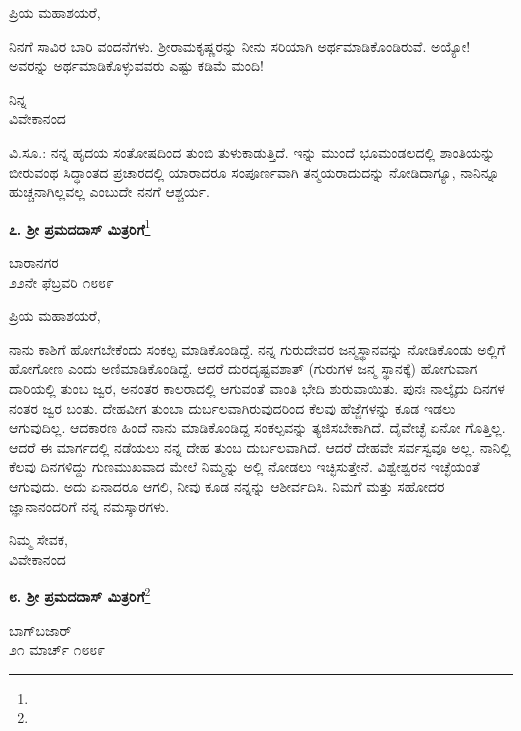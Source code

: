 \noindent
ಪ್ರಿಯ ಮಹಾಶಯರೆ,

ನಿನಗೆ ಸಾವಿರ ಬಾರಿ ವಂದನೆಗಳು. ಶ‍್ರೀರಾಮಕೃಷ್ಣರನ್ನು ನೀನು ಸರಿಯಾಗಿ ಅರ್ಥಮಾಡಿಕೊಂಡಿರುವೆ. ಅಯ್ಯೋ! ಅವರನ್ನು ಅರ್ಥಮಾಡಿಕೊಳ್ಳುವವರು ಎಷ್ಟು ಕಡಿಮೆ ಮಂದಿ!

\vspace{-0.3cm}

{\flushright
ನಿನ್ನ\\ವಿವೇಕಾನಂದ\par}

ವಿ.ಸೂ.:\enginline{-} ನನ್ನ ಹೃದಯ ಸಂತೋಷದಿಂದ ತುಂಬಿ ತುಳುಕಾಡುತ್ತಿದೆ. ಇನ್ನು ಮುಂದೆ ಭೂಮಂಡಲದಲ್ಲಿ ಶಾಂತಿಯನ್ನು ಬೀರುವಂಥ ಸಿದ್ಧಾಂತದ ಪ್ರಚಾರದಲ್ಲಿ ಯಾರಾದರೂ ಸಂಪೂರ್ಣವಾಗಿ ತನ್ಮಯರಾದುದನ್ನು ನೋಡಿದಾಗ್ಯೂ, ನಾನಿನ್ನೂ ಹುಚ್ಚನಾಗಿಲ್ಲವಲ್ಲ ಎಂಬುದೇ ನನಗೆ ಆಶ್ಚರ್ಯ.

\begin{center}
\textbf{೭. ಶ‍್ರೀ ಪ್ರಮದದಾಸ್ ಮಿತ್ರರಿಗೆ}\footnote{}
\end{center}

\begin{flushright}
ಬಾರಾನಗರ\\೨೨ನೇ ಫೆಬ್ರವರಿ ೧೮೮೯
\end{flushright}

\noindent
ಪ್ರಿಯ ಮಹಾಶಯರೆ,

ನಾನು ಕಾಶಿಗೆ ಹೋಗಬೇಕೆಂದು ಸಂಕಲ್ಪ ಮಾಡಿಕೊಂಡಿದ್ದೆ. ನನ್ನ ಗುರುದೇವರ ಜನ್ಮಸ್ಥಾನವನ್ನು ನೋಡಿಕೊಂಡು ಅಲ್ಲಿಗೆ ಹೋಗೋಣ ಎಂದು ಅಣಿಮಾಡಿಕೊಂಡಿದ್ದೆ. ಆದರೆ ದುರದೃಷ್ಟವಶಾತ್ (ಗುರುಗಳ ಜನ್ಮ ಸ್ಥಾನಕ್ಕೆ) ಹೋಗುವಾಗ ದಾರಿಯಲ್ಲಿ ತುಂಬ ಜ್ವರ, ಅನಂತರ ಕಾಲರಾದಲ್ಲಿ ಆಗುವಂತೆ ವಾಂತಿ ಭೇದಿ ಶುರುವಾಯಿತು. ಪುನಃ ನಾಲ್ಕೈದು ದಿನಗಳ ನಂತರ ಜ್ವರ ಬಂತು. ದೇಹವೀಗ ತುಂಬಾ ದುರ್ಬಲವಾಗಿರುವುದರಿಂದ ಕೆಲವು ಹೆಜ್ಜೆಗಳನ್ನು ಕೂಡ ಇಡಲು ಆಗುವುದಿಲ್ಲ. ಆದಕಾರಣ ಹಿಂದೆ ನಾನು ಮಾಡಿಕೊಂಡಿದ್ದ ಸಂಕಲ್ಪವನ್ನು ತ್ಯಜಿಸಬೇಕಾಗಿದೆ. ದೈವೇಚ್ಛೆ ಏನೋ ಗೊತ್ತಿಲ್ಲ. ಆದರೆ ಈ ಮಾರ್ಗದಲ್ಲಿ ನಡೆಯಲು ನನ್ನ ದೇಹ ತುಂಬ ದುರ್ಬಲವಾಗಿದೆ. ಆದರೆ ದೇಹವೇ ಸರ್ವಸ್ವವೂ ಅಲ್ಲ. ನಾನಿಲ್ಲಿ ಕೆಲವು ದಿನಗಳಿದ್ದು ಗುಣಮುಖವಾದ ಮೇಲೆ ನಿಮ್ಮನ್ನು ಅಲ್ಲಿ ನೋಡಲು ಇಚ್ಛಿಸುತ್ತೇನೆ. ವಿಶ್ವೇಶ್ವರನ ಇಚ್ಛೆಯಂತೆ ಆಗುವುದು. ಅದು ಏನಾದರೂ ಆಗಲಿ, ನೀವು ಕೂಡ ನನ್ನನ್ನು ಆಶೀರ್ವದಿಸಿ. ನಿಮಗೆ ಮತ್ತು ಸಹೋದರ ಜ್ಞಾನಾನಂದರಿಗೆ ನನ್ನ ನಮಸ್ಕಾರಗಳು.

{\flushright
ನಿಮ್ಮ ಸೇವಕ,\\ವಿವೇಕಾನಂದ\par}

\begin{center}
\textbf{೮. ಶ‍್ರೀ ಪ್ರಮದದಾಸ್‌ ಮಿತ್ರರಿಗೆ}\footnote{}
\end{center}
\vspace{-0.5cm}

\begin{flushright}
ಬಾಗ್‌ಬಜಾರ್\\೨೧ ಮಾರ್ಚ್ ೧೮೮೯
\end{flushright}


